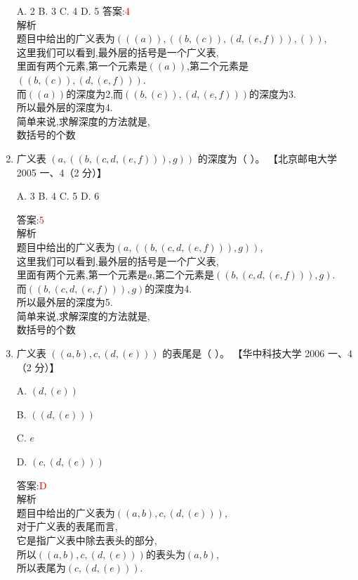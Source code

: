 \documentclass[lang=cn,newtx,10pt,scheme=chinese]{../elegantbook}
\begin{document}
\begin{enumerate}
    A. 2 \quad B. 3 \quad C. 4 \quad D. 5  
    答案:\textcolor{red}{4}\\
    解析\\
    题目中给出的广义表为$(((a)), ((b, (c)), (d, (e, f))), ())$,\\
    这里我们可以看到,最外层的括号是一个广义表,\\
    里面有两个元素,第一个元素是$((a))$,第二个元素是$((b, (c)), (d, (e, f)))$.\\
    而$((a))$的深度为2,而$((b, (c)), (d, (e, f)))$的深度为3.\\
    所以最外层的深度为4.\\

    简单来说,求解深度的方法就是,\\
    数括号的个数

    \item 广义表 $(a, ((b, (c, d, (e, f))), g))$ 的深度为（ ）。  
    【北京邮电大学 2005 一、4（2 分）】  

    A. 3 \quad B. 4 \quad C. 5 \quad D. 6  

    答案:\textcolor{red}{5}\\
    解析\\
    题目中给出的广义表为$(a, ((b, (c, d, (e, f))), g))$,\\
    这里我们可以看到,最外层的括号是一个广义表,\\
    里面有两个元素,第一个元素是$a$,第二个元素是$((b, (c, d, (e, f))), g)$.\\
    而$((b, (c, d, (e, f))), g)$的深度为4.\\
    所以最外层的深度为5.\\
    简单来说,求解深度的方法就是,\\
    数括号的个数\\

    \item 广义表 $((a, b), c, (d, (e)))$ 的表尾是（ ）。  
    【华中科技大学 2006 一、4（2 分）】  

    A. $(d, (e))$  

    B. $((d, (e)))$  

    C. $e$  

    D. $(c, (d, (e)))$  

    答案:\textcolor{red}{D}\\
    
    解析\\
    题目中给出的广义表为$((a, b), c, (d, (e)))$,\\
    对于广义表的表尾而言,\\
    它是指广义表中除去表头的部分,\\
    所以$((a, b), c, (d, (e)))$的表头为$(a, b)$,\\
    所以表尾为$(c, (d, (e)))$.\\


\end{enumerate}
\end{document}
